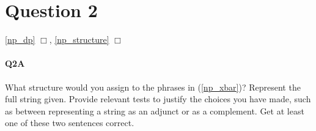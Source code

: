 \documentclass{article}
\begin{document}
\section*{Question 2}
\hfill \ref{np_dp} $\Box$,
\ref{np_structure} $\Box$

\paragraph{Q2A} What structure would you assign to the phrases in (\ref{np_xbar})?
Represent the full string given.
Provide relevant tests to justify the choices you have made, such as between representing a string as an adjunct or as a complement. Get at least one of these two sentences correct.
\begin{exe}
  \label{np_xbar}
\end{exe}

\end{document}

